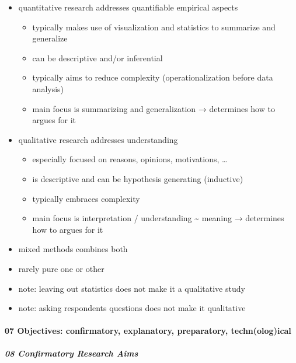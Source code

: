 \documentclass[
]{article}
\providecommand{\tightlist}{%
  \setlength{\itemsep}{0pt}\setlength{\parskip}{0pt}}
\begin{document}
\begin{itemize}
\tightlist
\item
  quantitative research addresses quantifiable empirical aspects

  \begin{itemize}
  \tightlist
  \item
    typically makes use of visualization and statistics to summarize and
    generalize
  \item
    can be descriptive and/or inferential
  \item
    typically aims to reduce complexity (operationalization before data
    analysis)
  \item
    main focus is summarizing and generalization → determines how to
    argues for it
  \end{itemize}
\item
  qualitative research addresses understanding

  \begin{itemize}
  \tightlist
  \item
    especially focused on reasons, opinions, motivations, \ldots{}
  \item
    is descriptive and can be hypothesis generating (inductive)
  \item
    typically embraces complexity
  \item
    main focus is interpretation / understanding \textasciitilde{}
    meaning → determines how to argues for it
  \end{itemize}
\item
  mixed methods combines both
\item
  rarely pure one or other
\item
  note: leaving out statistics does not make it a qualitative study
\item
  note: asking respondents questions does not make it qualitative
\end{itemize}

\hypertarget{objectives-confirmatory-explanatory-preparatory-technological}{%
\paragraph{07 Objectives: confirmatory, explanatory, preparatory,
techn(olog)ical}\label{objectives-confirmatory-explanatory-preparatory-technological}}

\hypertarget{confirmatory-research-aims}{%
\subparagraph{08 Confirmatory Research
Aims}\label{confirmatory-research-aims}}
\end{document}
